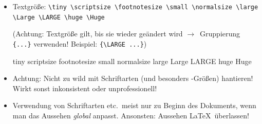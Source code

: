 \begin{frame}[<+->][fragile]
	\begin{itemize}
		\item Textgröße: \lstinline!\tiny \scriptsize \footnotesize \small \normalsize \large \Large \LARGE \huge \Huge!
		
		(Achtung: Textgröße gilt, bis sie wieder geändert wird
		$\rightarrow$~Gruppierung \lstinline!{...}! verwenden!
		Beispiel: \lstinline!{\LARGE ...}!)
		
		{\rmfamily
		\tiny tiny \scriptsize scriptsize \footnotesize footnotesize \small small \normalsize normalsize \large large \Large Large \LARGE LARGE \huge huge \Huge Huge}
		\item Achtung: Nicht zu wild mit Schriftarten (und besonders -Größen) hantieren! Wirkt sonst inkonsistent oder unprofessionell!
		\item Verwendung von Schriftarten etc.\ meist nur zu Beginn des Dokuments, wenn man das Aussehen \emph{global} anpasst. Ansonsten: Aussehen \LaTeX\ überlassen!
	\end{itemize}
\end{frame}

